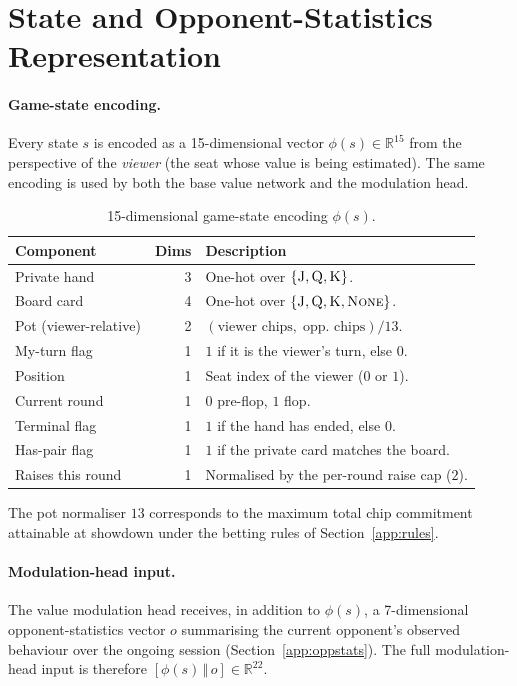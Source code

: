 \section{State and Opponent-Statistics Representation}
\label{app:state}

\paragraph{Game-state encoding.}
Every state $s$ is encoded as a 15-dimensional vector
$\phi(s) \in \mathbb{R}^{15}$ from the perspective of the \emph{viewer}
(the seat whose value is being estimated). The same encoding is used by
both the base value network and the modulation head.

\begin{table}[h]
\centering
\caption{15-dimensional game-state encoding $\phi(s)$.}
\label{tab:state}
\begin{tabular}{lrl}
\toprule
\textbf{Component} & \textbf{Dims} & \textbf{Description} \\
\midrule
Private hand            & 3 & One-hot over $\{\textsc{J},\textsc{Q},\textsc{K}\}$. \\
Board card              & 4 & One-hot over $\{\textsc{J},\textsc{Q},\textsc{K},\textsc{None}\}$. \\
Pot (viewer-relative)   & 2 & $(\text{viewer chips},\;\text{opp.\ chips}) / 13$. \\
My-turn flag            & 1 & $1$ if it is the viewer's turn, else $0$. \\
Position                & 1 & Seat index of the viewer ($0$ or $1$). \\
Current round           & 1 & $0$ pre-flop, $1$ flop. \\
Terminal flag           & 1 & $1$ if the hand has ended, else $0$. \\
Has-pair flag           & 1 & $1$ if the private card matches the board. \\
Raises this round       & 1 & Normalised by the per-round raise cap ($2$). \\
\bottomrule
\end{tabular}
\end{table}

The pot normaliser $13$ corresponds to the maximum total chip commitment
attainable at showdown under the betting rules of Section~\ref{app:rules}.

\paragraph{Modulation-head input.}
The value modulation head receives, in addition to $\phi(s)$, a
7-dimensional opponent-statistics vector $o$ summarising the current
opponent's observed behaviour over the ongoing session
(Section~\ref{app:oppstats}). The full modulation-head input is therefore
$[\phi(s)\,\Vert\,o] \in \mathbb{R}^{22}$.

